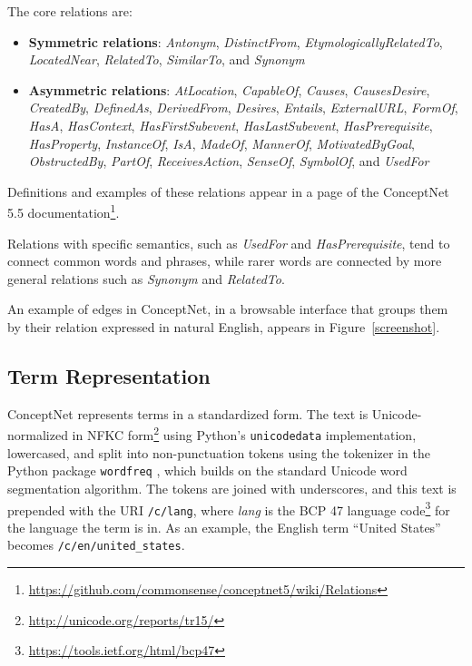 \documentclass[letterpaper]{article}
\begin{document}
The core relations are:
\begin{itemize}
    \item {\bf Symmetric relations}: \emph{Antonym}, \emph{DistinctFrom},
        \emph{EtymologicallyRelatedTo}, \emph{LocatedNear},
        \emph{RelatedTo}, \emph{SimilarTo}, and \emph{Synonym}
    \item {\bf Asymmetric relations}: \emph{AtLocation}, \emph{CapableOf},
        \emph{Causes}, \emph{CausesDesire}, \emph{CreatedBy},
        \emph{DefinedAs}, \emph{DerivedFrom}, \emph{Desires},
        \emph{Entails}, \emph{ExternalURL},
        \emph{FormOf}, \emph{HasA}, \emph{HasContext},
        \emph{HasFirstSubevent}, \emph{HasLastSubevent},
        \emph{HasPrerequisite}, \emph{HasProperty}, \emph{InstanceOf},
        \emph{IsA}, \emph{MadeOf}, \emph{MannerOf}, \emph{MotivatedByGoal},
        \emph{ObstructedBy}, \emph{PartOf}, \emph{ReceivesAction},
        \emph{SenseOf}, \emph{SymbolOf}, and \emph{UsedFor}
\end{itemize}

Definitions and examples of these relations appear in a page of the ConceptNet 5.5
documentation\footnote{\url{https://github.com/commonsense/conceptnet5/wiki/Relations}}.

Relations with specific semantics, such as \emph{UsedFor} and
\emph{HasPrerequisite}, tend to connect common words and phrases, while
rarer words are connected by more general relations such as
\emph{Synonym} and \emph{RelatedTo}.

An example of edges in ConceptNet, in a browsable interface that groups them by
their relation expressed in natural English, appears in
Figure~\ref{screenshot}.

\subsection{Term Representation}\label{term-representation}

ConceptNet represents terms in a standardized form. The text is
Unicode-normalized in NFKC form\footnote{\url{http://unicode.org/reports/tr15/}}
using Python's {\tt unicodedata} implementation, lowercased, and split into non-punctuation tokens
using the tokenizer in the Python package \texttt{wordfreq}
\cite{speer2016wordfreq}, which builds on the standard Unicode word
segmentation algorithm. The tokens are joined with underscores, and this text
is prepended with the URI \texttt{/c/lang}, where \emph{lang} is the BCP 47
language code\footnote{\url{https://tools.ietf.org/html/bcp47}} for the language the term is in. As an example, the English term
``United States'' becomes \texttt{/c/en/united\_states}.
\end{document}
